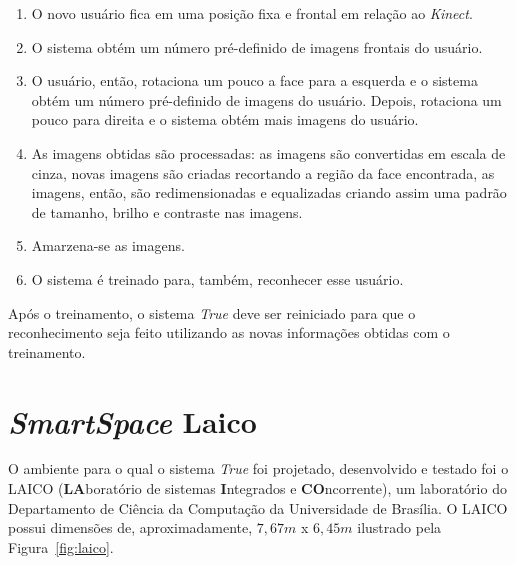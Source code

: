 		\begin{enumerate}
			\item O novo usuário fica em uma posição fixa e frontal em relação ao \textit{Kinect}. 
			\item O sistema obtém um número pré-definido de imagens frontais do usuário.
			\item O usuário, então, rotaciona um pouco a face para a esquerda e o sistema obtém um número pré-definido de imagens do usuário. Depois, rotaciona um pouco para direita e o sistema obtém mais imagens do usuário.
			\item As imagens obtidas são processadas: as imagens são convertidas em escala de cinza, novas imagens são criadas recortando a região da face encontrada, as imagens, então, são redimensionadas e equalizadas criando assim uma padrão de tamanho, brilho e contraste nas imagens.
			\item Amarzena-se as imagens.
			\item O sistema é treinado para, também, reconhecer esse usuário.
		\end{enumerate}

	Após o treinamento, o sistema \textit{True} deve ser reiniciado para que o reconhecimento seja feito utilizando as novas informações obtidas com o treinamento.

\section{\textit{SmartSpace} Laico}

	O ambiente para o qual o sistema \textit{True} foi projetado, desenvolvido e testado foi o LAICO (\textbf{LA}boratório de sistemas \textbf{I}ntegrados e \textbf{CO}ncorrente), um laboratório do Departamento de Ciência da Computação da Universidade de Brasília. O LAICO possui dimensões de, aproximadamente,  $\displaystyle 7,67m$ x $\displaystyle 6,45m$ ilustrado pela Figura~\ref{fig:laico}.

